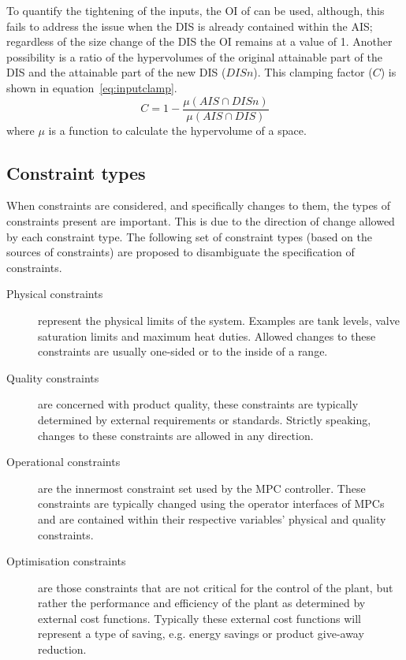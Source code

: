 \documentclass[final,authoryear,5pt,times,twocolumn]{elsarticle}
\begin{document}
To quantify the tightening of the inputs, the OI of \citet{vinsonphd} can be used, although, this fails to address the issue when the DIS is already contained within the AIS; regardless of the size change of the DIS the OI remains at a value of 1.
Another possibility is a ratio of the hypervolumes of the original attainable part of the DIS and the attainable part of the new DIS ($DISn$).
This clamping factor ($C$) is shown in equation~\ref{eq:inputclamp}.
\begin{equation}
  \label{eq:inputclamp}
  C = 1-\frac{\mu(AIS \cap DISn)}{\mu(AIS \cap DIS)}
\end{equation}
where $\mu$ is a function to calculate the hypervolume of a space.

\subsection{Constraint types}\label{sec:contypes}
When constraints are considered, and specifically changes to them, the types of constraints present are important.
This is due to the direction of change allowed by each constraint type.
The following set of constraint types (based on the sources of constraints) are proposed to disambiguate the specification of constraints.
\begin{description}
  \item [Physical constraints] represent the physical limits of the system.
  Examples are tank levels, valve saturation limits and maximum heat duties.
  Allowed changes to these constraints are usually one-sided or to the inside of a range.
  \item [Quality constraints] are concerned with product quality, these constraints are typically determined by external requirements or standards.
  Strictly speaking, changes to these constraints are allowed in any direction.
  \item [Operational constraints] are the innermost constraint set used by the MPC controller.
  These constraints are typically changed using the operator interfaces of MPCs and are contained within their respective variables' physical and quality constraints.
  \item [Optimisation constraints] are those constraints that are not critical for the control of the plant, but rather the performance and efficiency of the plant as determined by external cost functions.
  Typically these external cost functions will represent a type of saving, e.g. energy savings or product give-away reduction.
\end{description}
\end{document}
